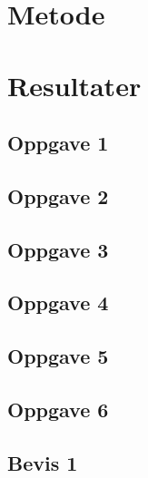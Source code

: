 \documentclass{article}
\begin{document}
\section{Metode} %
\label{sec:metode}

\newpage


\section{Resultater} %
\label{sec:resultater}


\subsection{Oppgave 1} %
\label{sub:oppgave_1}

\newpage


\subsection{Oppgave 2} %
\label{sub:oppgave_2}

\newpage


\subsection{Oppgave 3} %
\label{sub:oppgave_3}

\newpage


\subsection{Oppgave 4} %
\label{sub:oppgave_4}

\newpage


\subsection{Oppgave 5} %
\label{sub:oppgave_5}

\newpage


\subsection{Oppgave 6} %
\label{sub:oppgave_6}

\newpage


\subsection{Bevis 1} %
\label{sub:bevis_1}
%
\end{document}
